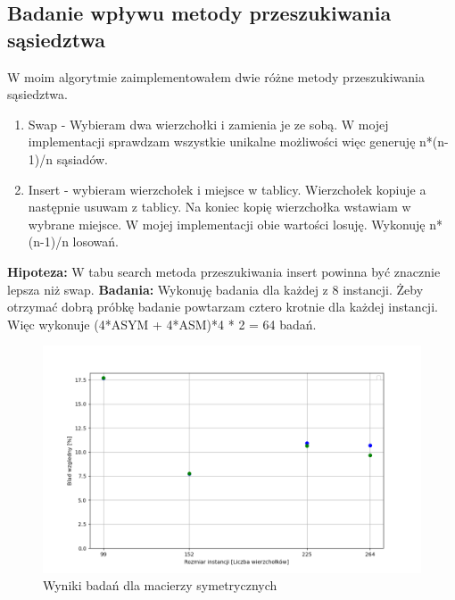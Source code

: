 \documentclass{article}
\begin{document}
      \subsection{Badanie wpływu metody przeszukiwania sąsiedztwa} 
        W moim algorytmie zaimplementowałem dwie różne metody przeszukiwania sąsiedztwa.
        \begin{enumerate}
          \item Swap - Wybieram dwa wierzchołki i zamienia je ze sobą. W mojej implementacji
          sprawdzam wszystkie unikalne możliwości więc generuję n*(n-1)/n sąsiadów.
          \item Insert - wybieram wierzchołek i miejsce w tablicy. Wierzchołek kopiuje a następnie 
          usuwam z tablicy. Na koniec kopię wierzchołka wstawiam w wybrane miejsce. W mojej 
          implementacji obie wartości losuję. Wykonuję n*(n-1)/n losowań.
        \end{enumerate}
        \textbf{Hipoteza: } W tabu search metoda przeszukiwania insert powinna być znacznie lepsza
        niż swap.
        \textbf{Badania: } Wykonuję badania dla każdej z 8 instancji. Żeby otrzymać dobrą próbkę 
        badanie powtarzam cztero krotnie dla każdej instancji. Więc wykonuje (4*ASYM + 4*ASM)*4 * 2 = 64
        badań.
        
        \FloatBarrier
        \begin{figure}[ht]
          \centering
          \includegraphics[width=\textwidth]{src/plots/symTsNeighMet.png}
          \caption{Wyniki badań dla macierzy symetrycznych}
          \label{fig:symNeighg}
        \end{figure}
\end{document}
